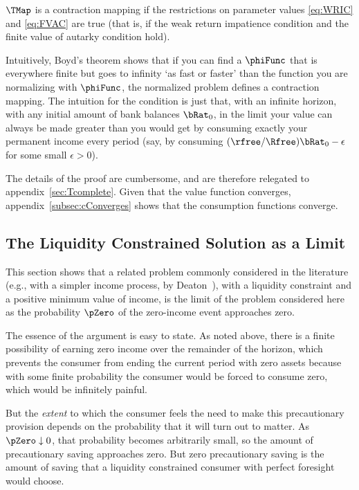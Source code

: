 \documentclass[BufferStockTheory]{subfiles}
\begin{document}
\hypertarget{MainTheorem}{}
\setcounter{theorem}{0}
\begin{theorem}
  \label{thm:contmap} $\TMap$ is a contraction mapping if
  the restrictions on parameter values \eqref{eq:WRIC} and
  \eqref{eq:FVAC} are true (that is, if the weak return impatience condition and the finite value of autarky condition hold).
\end{theorem}

Intuitively, Boyd's theorem shows that if you can find a $\phiFunc$ that is everywhere finite but goes to infinity `as fast or faster' than the function you are normalizing with $\phiFunc$, the normalized problem defines a contraction mapping.  The intuition for the {\FVAC} condition is just that, with an infinite horizon, with any initial amount of bank balances $\bRat_{0}$, in the limit your value can always be made greater than you would get by consuming exactly your permanent income every period (say, by consuming $(\rfree/\Rfree)\bRat_{0}-\epsilon$ for some small $\epsilon>0$).

The details of the proof are cumbersome, and are therefore relegated to
appendix~\ref{sec:Tcomplete}.  Given that the value function
converges, appendix~\ref{subsec:cConverges} shows that the consumption
functions converge.

\hypertarget{The-Liquidity-Constrained-Solution-as-a-Limit}{}
\subsection{The Liquidity Constrained Solution as a Limit} \label{sec:deatonIsLimit}

This section shows that a related problem commonly considered in the
literature (e.g., with a simpler income process, by
Deaton~\citeyearpar{deatonLiqConstr}), with a liquidity constraint
and a positive minimum value of income, is the limit of the problem
considered here as the probability $\pZero$ of the zero-income event
approaches zero.

The essence of the argument is easy to state.  As noted above, there is a finite possibility of earning zero income over the remainder of the horizon, which prevents
the consumer from ending the current period with zero assets because
with some finite probability the consumer would be forced to consume zero,
which would be infinitely painful.

But the \textit{extent} to which the consumer feels the need to make this
precautionary provision depends on the probability that it will turn
out to matter.  As $\pZero \downarrow 0$, that probability becomes
arbitrarily small, so the amount of precautionary saving approaches zero.
But zero precautionary saving is the amount of saving that a liquidity
constrained consumer with perfect foresight would choose.
\end{document}
